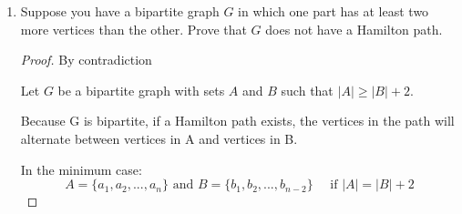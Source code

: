 \documentclass[11pt, letterpaper, includehead]{article}
\theoremstyle{plain}
\theoremstyle{mydefinition}
\theoremstyle{myproperty}
\begin{document}
\begin{enumerate}[label=\textbf{\arabic*}., leftmargin=*]
\begin{enumerate}[label=(\alph*)]
        \begin{proof} By contradiction
           
            Assume the graph contains a Hamilton cycle.
            
            A Hamilton cycle visits every vertex exactly once, beginning and ending at the same vertex. 

            For a bipartite graph, this implies the Hamilton cycle must alternate between vertices in set $A$ and $B$, as no vertices in the same set are adjacent.

            For the given graph $|A| = |B|+ 1$.

            \underline{Case 1:} Start at a vertex in set A
       
            The cycle can then be described as:
            \[(a_1, b_1, a_2, b_2,..., a_{n - 1}, b_{n - 1}, a_n, a_1) \quad \text{ s.t. } a \in A \text{ and } b \in B\]

            But $a_1, a_n \in A$ and thus cannot be adjacent which is a contradiction.

            \underline{Case 2:} Start at a vertex in set B
            
            The cycle can then be described as:
            \[(b_1, a_1, b_2, a_2,..., b_{n - 1}, a_{n - 1}, a_n, b_1) \quad \text{ s.t. } a \in A \text{ and } b \in B\]
           
            Note vertex $b_n$ does not exist as $|A| = |B|+ 1$. $a_{n-1}, a_n \in A$ and thus cannot be adjacent which is a contradiction.

            Therefore by contradiction there cannot exist a Hamilton cycle.  
            
        \end{proof}

        
        \item Suppose you have a bipartite graph $G$ in which one part has at least two more vertices than the other. Prove that $G$ does not have a Hamilton path.

        \begin{proof} By contradiction
    
            Let $G$ be a bipartite graph with sets $A$ and $B$ such that $|A| \ge |B| + 2$.
            
            Because G is bipartite, if a Hamilton path exists, the vertices in the path will alternate between vertices in A and vertices in B.

            In the minimum case: 
            \[A = \{a_1, a_2, ... , a_n\} \text{ and } B = \{b_1, b_2, ..., b_{n - 2}\} \quad \text{ if } |A| = |B| + 2\]


\end{proof}
\end{enumerate}
\end{enumerate}
\end{document}
